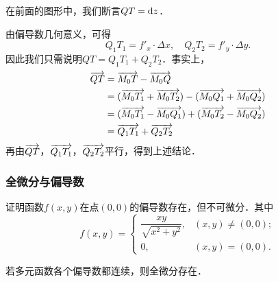 \documentclass[14pt,notheorems,leqno,xcolor={rgb}]{beamer} %
\begin{document}
\begin{rframe}
\begin{remark*}
在前面的图形中，我们断言$QT=\mathop{}\!\mathrm{d} z$．
\end{remark*}
\begin{solution}
由偏导数几何意义，可得
\[Q_1T_1=f'_x\cdot\Delta x,\quad Q_2T_2=f'_y\cdot\Delta y.\]
因此我们只需说明$QT = Q_1T_1 + Q_2T_2$．事实上，
\begin{align*}
\overrightarrow{QT} &= \overrightarrow{M_0T} - \overrightarrow{M_0Q} \\
&= (\overrightarrow{M_0T_1}+\overrightarrow{M_0T_2}) - (\overrightarrow{M_0Q_1}+\overrightarrow{M_0Q_2}) \\
&= (\overrightarrow{M_0T_1}-\overrightarrow{M_0Q_1}) + (\overrightarrow{M_0T_2}-\overrightarrow{M_0Q_2}) \\
&= \overrightarrow{Q_1T_1} + \overrightarrow{Q_2T_2}
\end{align*}
再由$\overrightarrow{QT}$，$\overrightarrow{Q_1T_1}$，$\overrightarrow{Q_2T_2}$平行，得到上述结论．
\end{solution}
\end{rframe}

\begin{frame}
\frametitle{全微分与偏导数}
\begin{example}
证明函数$f(x,y)$在点$(0,0)$的偏导数存在，但不可微分．其中
$$f(x,y)=\begin{cases}
  \dfrac{xy}{\sqrt{x^2+y^2}}, & (x,y)\neq(0,0); \\[1em]
  0, & (x,y) = (0,0).
\end{cases}$$
\end{example}
\vpause
\begin{theorem*}%
若多元函数各个偏导数都连续，则全微分存在．
\end{theorem*}
\end{frame}

\end{document}
